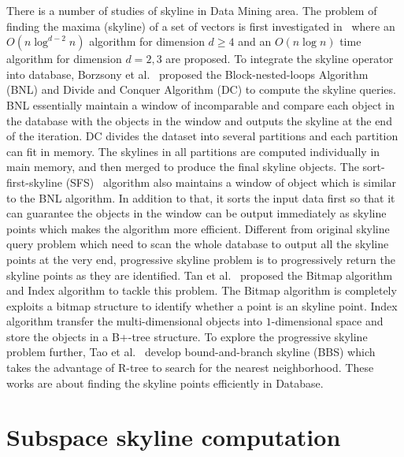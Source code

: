 There is a number of studies of skyline in Data Mining area. The problem of finding the maxima (skyline) of a set of vectors is first investigated in~\cite{kung1975finding} where an $O(n\log ^{d-2}n)$ algorithm for dimension $d\geq 4$ and an $O(n\log n)$ time algorithm for dimension $d = 2, 3$ are proposed. To integrate the skyline operator into database, Borzsony et al.~\cite{borzsony2001skyline} proposed the Block-nested-loops Algorithm (BNL) and Divide and Conquer Algorithm (DC) to compute the skyline queries. BNL essentially maintain a window of incomparable and compare each object in the database with the objects in the window and outputs the skyline at the end of the iteration. DC divides the dataset into several partitions and each partition can fit in memory. The skylines in all partitions are computed individually in main memory, and then merged to produce the final skyline objects. 
The sort-first-skyline (SFS)~\cite{chomicki2003skyline} algorithm also maintains a window of object which is similar to the BNL algorithm. In addition to that, it sorts the input data first so that it can guarantee the objects in the window can be output immediately as skyline points which makes the algorithm more efficient.
Different from original skyline query problem which need to scan the whole database to output all the skyline points at the very end, progressive skyline problem is to progressively return the skyline points as they are identified. Tan et al.~\cite{tan2001efficient} proposed the Bitmap algorithm and Index algorithm to tackle this problem. The Bitmap algorithm is completely exploits a bitmap structure to identify whether a point is an skyline point. Index algorithm transfer the multi-dimensional objects into $1$-dimensional space and store the objects in a B+-tree structure. To explore the progressive skyline problem further, Tao et al.~\cite{papadias2005progressive} develop bound-and-branch skyline (BBS) which takes the advantage of R-tree to search for the nearest neighborhood. These works are about finding the skyline points efficiently in Database.

\section{Subspace skyline computation}
\label{sec:rel:subspace}

